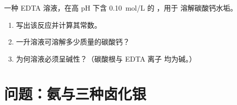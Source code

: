 \begin{exercise}[$\star\star\star$]\label{exo:b1:complexation:12}
一种 EDTA 溶液，在高 pH 下含 \qty{0.10}{mol/L} 的 ，用于
溶解碳酸钙水垢。
\begin{enumerate}
  \item 写出该反应并计算其常数。
  \item 一升溶液可溶解多少质量的碳酸钙？
  \item 为何溶液必须呈碱性？（碳酸根与 EDTA 离子
        均为碱。）
\end{enumerate}
\end{exercise}

\section{问题：氨与三种卤化银}

